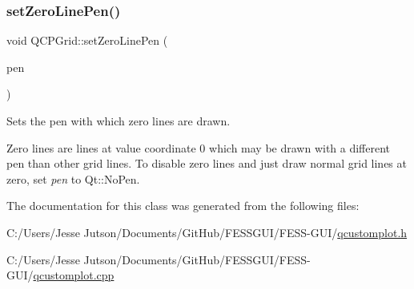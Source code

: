\subsubsection{\texorpdfstring{set\+Zero\+Line\+Pen()}{setZeroLinePen()}}
{\footnotesize\ttfamily void Q\+C\+P\+Grid\+::set\+Zero\+Line\+Pen (\begin{DoxyParamCaption}\item[{const Q\+Pen \&}]{pen }\end{DoxyParamCaption})}

Sets the pen with which zero lines are drawn.

Zero lines are lines at value coordinate 0 which may be drawn with a different pen than other grid lines. To disable zero lines and just draw normal grid lines at zero, set {\itshape pen} to Qt\+::\+No\+Pen. 

The documentation for this class was generated from the following files\+:\begin{DoxyCompactItemize}
\item 
C\+:/\+Users/\+Jesse Jutson/\+Documents/\+Git\+Hub/\+F\+E\+S\+S\+G\+U\+I/\+F\+E\+S\+S-\/\+G\+U\+I/\hyperlink{qcustomplot_8h}{qcustomplot.\+h}\item 
C\+:/\+Users/\+Jesse Jutson/\+Documents/\+Git\+Hub/\+F\+E\+S\+S\+G\+U\+I/\+F\+E\+S\+S-\/\+G\+U\+I/\hyperlink{qcustomplot_8cpp}{qcustomplot.\+cpp}\end{DoxyCompactItemize}

